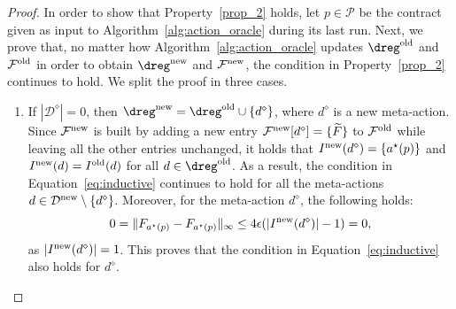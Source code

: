\begin{proof}
	
	In order to show that Property~\ref{prop_2} holds, let $p \in \mathcal{P}$ be the contract given as input to Algorithm~\ref{alg:action_oracle} during its last run.
	Next, we prove that, no matter how Algorithm~\ref{alg:action_oracle} updates $\dreg^{\textnormal{old}}$ and $\mathcal{F}^{\textnormal{old}}$ in order to obtain $\dreg^{\textnormal{new}}$ and $\mathcal{F}^{\textnormal{new}}$, the condition in Property~\ref{prop_2} continues to hold.
	We split the proof in three cases.
	\begin{enumerate}
		\item If $|\mathcal{D}^\diamond| = 0$, then $ \dreg^{\textnormal{new}} = \dreg^{\textnormal{old}} \cup \{d^\diamond \}$, where $d^\diamond$ is a new meta-action.
		Since $\mathcal{F}^{\textnormal{new}}$ is built by adding a new entry $\mathcal{F}^{\textnormal{new}}[d^\diamond] = \{ \widetilde{F} \}$ to $\mathcal{F}^{\textnormal{old}}$ while leaving all the other entries unchanged, it holds that $I^{\textnormal{new}}(d^\diamond) = \{ a^\star(p) \}$ and $I^{\textnormal{new}}(d) =  I^{\textnormal{old}}(d)  $ for all $d \in \dreg^{\textnormal{old}}$.
		As a result, the condition in Equation~\eqref{eq:inductive} continues to hold for all the meta-actions $d \in \mathcal{D}^{\textnormal{new}} \setminus \{ d^\diamond\}$.
		Moreover, for the meta-action $d^\diamond$, the following holds:
		\begin{equation*}
			0 = \|F_{a^\star(p)}-F_{a^\star(p)}\|_{\infty} \le 4 \epsilon (|I^{\textnormal{new}} (d^\diamond)|-1) = 0,
		\end{equation*}
		as $|I^{\textnormal{new}} (d^\diamond)|=1$. This proves that the condition in Equation~\eqref{eq:inductive} also holds for $d^\diamond$.
		

\end{enumerate}
\end{proof}
